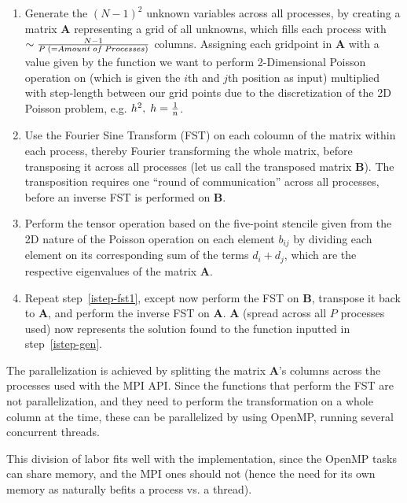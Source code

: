\documentclass[fontsize=11pt,paper=a4,titlepage]{article}
\begin{document}
\begin{enumerate}

	\item \label{istep-gen} Generate the $(N - 1)^2$ unknown variables across
	all processes, by creating a matrix $\mathbf{A}$ representing a grid of all
	unknowns, which fills each process with $\sim \frac{N-1}{P \thickspace (=
	Amount 	\thickspace of\thickspace Processes)}$ columns. Assigning each
	gridpoint in $\mathbf{A}$ with a value given by the function we want to
	perform 2-Dimensional Poisson operation on (which is given the $i$th and
	$j$th position as input) multiplied with step-length between our grid points
	due to the discretization of the 2D Poisson problem, e.g. $h^2, \thickspace
	h = \frac{1}{n}$.

	\item \label{istep-fst1} Use the Fourier Sine Transform (FST) on each
	coloumn of the matrix within each process, thereby Fourier transforming the
	whole matrix, before transposing it across all processes (let us call the
	transposed matrix $\mathbf{B}$). The transposition requires one ``round
	of communication'' across all processes, before an inverse FST is performed
	on $\mathbf{B}$.

	\item \label{istep-tens} Perform the tensor operation based on the
	five-point stencile given from the 2D nature of the Poisson operation on
	each element $b_{ij}$ by dividing each element on its corresponding sum of
	the terms $d_i + d_j$, which are the respective eigenvalues of the matrix $
	\mathbf{A}$.

	\item \label{istep-fst2} Repeat step~\ref{istep-fst1}, except now perform
	the FST on $\mathbf{B}$, transpose it back to $\mathbf{A}$, and perform the
	inverse FST on $\mathbf{A}$. $\mathbf{A}$ (spread across all $P$ processes
	used) now represents the solution found to the function inputted in
	step~\ref{istep-gen}.

\end{enumerate}

The parallelization is achieved by splitting the matrix $\mathbf{A}$'s columns
across the processes used with the MPI API. Since the functions that perform the
FST are not parallelization, and they need to perform the transformation on a
whole column at the time, these can be parallelized by using OpenMP, running
several concurrent threads.

This division of labor fits well with the implementation, since the OpenMP tasks
can share memory, and the MPI ones should not (hence the need for its own memory
as naturally befits a process vs. a thread).
\end{document}
